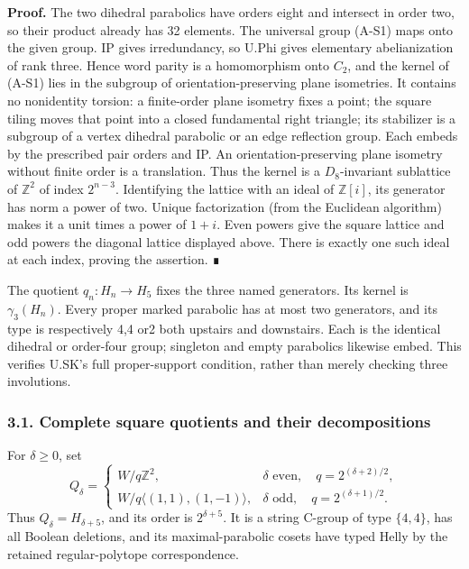 \documentclass[
  11pt,
  a4paper,
]{article}
\begin{document}
\textbf{Proof.} The two dihedral parabolics have orders eight and
intersect in order two, so their product already has 32 elements. The
universal group (A-S1) maps onto the given group. IP gives irredundancy,
so U.Phi gives elementary abelianization of rank three. Hence word
parity is a homomorphism onto \(C_2\), and the kernel of (A-S1) lies in
the subgroup of orientation-preserving plane isometries. It contains no
nonidentity torsion: a finite-order plane isometry fixes a point; the
square tiling moves that point into a closed fundamental right triangle;
its stabilizer is a subgroup of a vertex dihedral parabolic or an edge
reflection group. Each embeds by the prescribed pair orders and IP. An
orientation-preserving plane isometry without finite order is a
translation. Thus the kernel is a \(D_8\)-invariant sublattice of
\(\mathbb Z^2\) of index \(2^{n-3}\). Identifying the lattice with an
ideal of \(\mathbb Z[i]\), its generator has norm a power of two. Unique
factorization (from the Euclidean algorithm) makes it a unit times a
power of \(1+i\). Even powers give the square lattice and odd powers the
diagonal lattice displayed above. There is exactly one such ideal at
each index, proving the assertion. ∎

The quotient \(q_n:H_n\to H_5\) fixes the three named generators. Its
kernel is \(\gamma_3(H_n)\). Every proper marked parabolic has at most
two generators, and its type is respectively 4,4 or2 both upstairs and
downstairs. Each is the identical dihedral or order-four group;
singleton and empty parabolics likewise embed. This verifies U.SK's full
proper-support condition, rather than merely checking three involutions.

\subsubsection{3.1. Complete square quotients and their
decompositions}\label{complete-square-quotients-and-their-decompositions}

For \(\delta\ge0\), set \[
 Q_\delta=
 \begin{cases}
 W/q\mathbb Z^2,&\delta\text{ even},\quad q=2^{(\delta+2)/2},\\
 W/q\langle(1,1),(1,-1)\rangle,&\delta\text{ odd},\quad q=2^{(\delta+1)/2}.
 \end{cases}
 \tag{A-S3}
\] Thus \(Q_\delta=H_{\delta+5}\), and its order is \(2^{\delta+5}\). It
is a string C-group of type \(\{4,4\}\), has all Boolean deletions, and
its maximal-parabolic cosets have typed Helly by the retained
regular-polytope correspondence.
\end{document}
